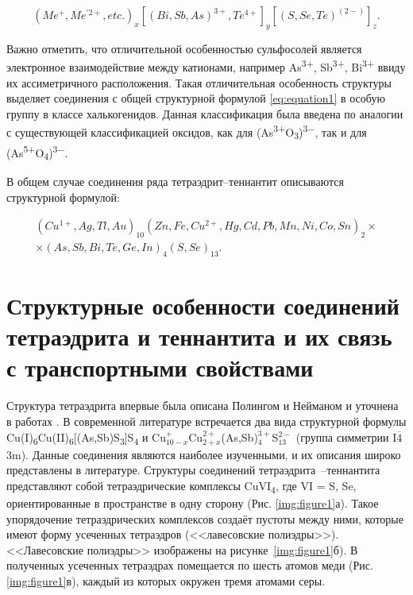 \begin{equation}
  \label{eq:equation1}
  (Me^+,Me^{'2+},etc.)_{x}[(Bi, Sb,As)^{3+}, Te^{4+}]_{y}[(S,Se,Te)^{(2-)}]_{z}.
\end{equation}

Важно отметить, что отличительной особенностью сульфосолей является электронное взаимодействие между катионами, например As\textsuperscript{3+}, Sb\textsuperscript{3+}, Bi\textsuperscript{3+} ввиду их ассиметричного расположения. Такая отличительная особенность структуры выделяет соединения с общей структурной формулой  \eqref{eq:equation1} в особую группу в классе халькогенидов. Данная классификация была введена по аналогии с существующей классификацией оксидов, как для (As\textsuperscript{3+}O\textsubscript{3})\textsuperscript{3$-$}, так и для (As\textsuperscript{5+}O\textsubscript{4})\textsuperscript{3$-$}\cite{Nowacki1969}.

В общем случае соединения ряда тетраэдрит--теннантит описываются структурной формулой:

\begin{equation}
  \label{eq:equation2}
      \begin{multlined}
      (Cu^{1+},Ag,Tl,Au)_{10}(Zn,Fe,Cu^{2+},Hg,Cd,Pb,Mn,Ni,Co,Sn)_{2}\times \\
      \times(As,Sb,Bi,Te,Ge,In)_{4}(S,Se)_{13}.
      \end{multlined}
\end{equation}
\newpage


\section{Структурные особенности соединений тетраэдрита и теннантита  и их связь с транспортными свойствами} \label{sect1_1}

 Структура тетраэдрита впервые была описана Полингом и Нейманом  \cite{Pauling1934} и уточнена в работах \cite{Wuensch1963,Wuensch1964,Belov1969,Kaplunnik1980}.
 В современной литературе встречается два вида структурной формулы Cu(I)\textsubscript{6}Cu(II)\textsubscript{6}[(As,Sb)S\textsubscript{3}]S\textsubscript{4}\cite{Johnson1986} и Cu$_{10-x}^{+}$Cu$_{2+x}^{2+}$(As,Sb)$_{4}^{3+}$S$_{13}^{2-}$ \cite{Friese2008,makovicky2005crystal,Foit2001} (группа симметрии I$\overline{\! 4}$3m).
Данные соединения являются наиболее изученными, и их описания широко представлены в литературе. Структуры соединений тетраэдрита~--теннантита представляют собой тетраэдрические комплексы  CuVI\textsubscript{4}, где VI = S, Se, ориентированные в пространстве в одну сторону (Рис. \ref{img:figure1}а). Такое упорядочение тетраэдрических комплексов создаёт пустоты между ними, которые имеют форму усеченных тетраэдров (<<лавесовские полиэдры>>). <<Лавесовские полиэдры>> изображены на рисунке~\ref{img:figure1}б). В полученных усеченных тетраэдрах помещается по шесть атомов меди (Рис. \ref{img:figure1}в), каждый из которых окружен тремя атомами серы\cite{Makovicky_2006}.

